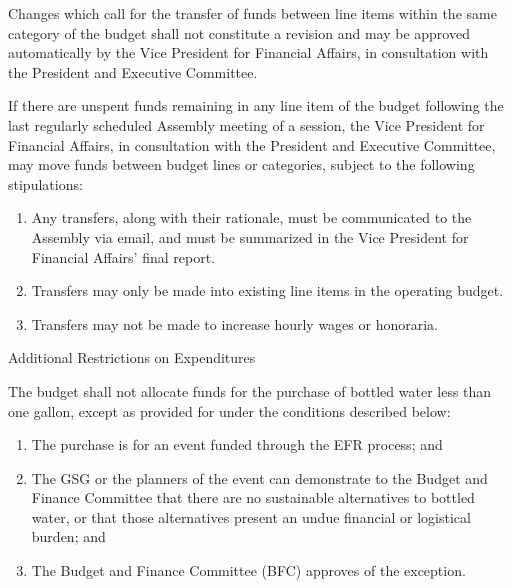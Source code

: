 \begin{bylaws-number}
\begin{bylaws-number}
    \item Changes which call for the transfer of funds between line items within the same category of the budget shall not constitute a revision and may be approved automatically by the Vice President for Financial Affairs, in consultation with the President and Executive Committee.
    \item If there are unspent funds remaining in any line item of the budget following the last regularly scheduled Assembly meeting of a session, the Vice President for Financial Affairs, in consultation with the President and Executive Committee, may move funds between budget lines or categories, subject to the following stipulations:
    \begin{enumerate}[i]
      \item Any transfers, along with their rationale, must be communicated to the Assembly via email, and must be summarized in the Vice President for Financial Affairs’ final report.
      \item Transfers may only be made into existing line items in the operating budget.
      \item Transfers may not be made to increase hourly wages or honoraria.
    \end{enumerate}
  \end{bylaws-number}
  \item Additional Restrictions on Expenditures
  \begin{bylaws-number}
    \item The budget shall not allocate funds for the purchase of bottled water less than one gallon, except as provided for under the conditions described below:
    \begin{enumerate}[i]
      \item The purchase is for an event funded through the EFR process; and
      \item The GSG or the planners of the event can demonstrate to the Budget and Finance Committee that there are no sustainable alternatives to bottled water, or that those alternatives present an undue financial or logistical burden; and
      \item The Budget and Finance Committee (BFC) approves of the exception.
    \end{enumerate}
  \end{bylaws-number}
 

\end{bylaws-number}
